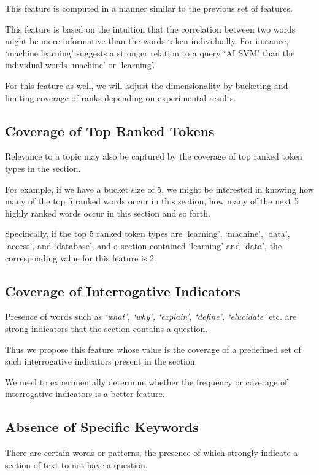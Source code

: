 \documentclass[10pt,a4paper]{report}
\begin{document}
This feature is computed in a manner similar to the previous set of features. 

This feature is based on the intuition that the correlation between two words might be more informative than the words taken individually. For instance, `machine learning' suggests a stronger relation to a query `AI SVM' than the
individual words `machine' or `learning'. 

For this feature as well, we will adjust the dimensionality by bucketing and limiting coverage of ranks depending on experimental results.

\subsection {Coverage of Top Ranked Tokens}

Relevance to a topic may also be captured by the coverage of top ranked token types in the section.\cite{squint}

For example, if we have a bucket size of 5, we might be interested in knowing how many of the top 5 ranked words occur in this section, how many of the next 5 highly ranked words occur in this section and so forth. 

Specifically, if the top 5 ranked token types are `learning', `machine', `data', `access', and `database', and a section contained `learning' and `data', the corresponding value for this feature is 2.

\subsection {Coverage of Interrogative Indicators}

Presence of words such as \textit{`what', `why', `explain', `define', `elucidate'} etc. are strong indicators that the section contains a question. 

Thus we propose this feature whose value is the coverage of a predefined set of such interrogative indicators present in the section.

We need to experimentally determine whether the frequency or coverage of interrogative indicators is a better feature.

\subsection {Absence of Specific Keywords}

There are certain words or patterns, the presence of which strongly indicate a section of text to not have a question. 
\end{document}
